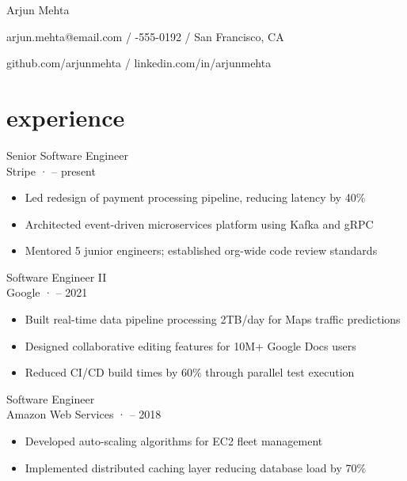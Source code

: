\documentclass[10pt,letterpaper]{article}
\begin{document}
\vspace*{-20pt}
{\huge{}\selectfont Arjun Mehta}

\vspace{8pt}
{\small\color{lightgray} arjun.mehta@email.com \enspace / -555-0192 \enspace / \enspace San Francisco, CA}

\vspace{4pt}
{\small\color{lightgray} github.com/arjunmehta \enspace / \enspace linkedin.com/in/arjunmehta}

\section{experience}

{\normalsize Senior Software Engineer} \\[1pt]
{\small\color{lightgray} Stripe \enspace ·  -- present}
\vspace{4pt}
\begin{itemize}[leftmargin=1em, label={\textcolor{lightgray}{--}}, topsep=0pt, itemsep=3pt, parsep=0pt]
  \item Led redesign of payment processing pipeline, reducing latency by 40\%
  \item Architected event-driven microservices platform using Kafka and gRPC
  \item Mentored 5 junior engineers; established org-wide code review standards
\end{itemize}

\vspace{10pt}
{\normalsize Software Engineer II} \\[1pt]
{\small\color{lightgray} Google \enspace ·  -- 2021}
\vspace{4pt}
\begin{itemize}[leftmargin=1em, label={\textcolor{lightgray}{--}}, topsep=0pt, itemsep=3pt, parsep=0pt]
  \item Built real-time data pipeline processing 2TB/day for Maps traffic predictions
  \item Designed collaborative editing features for 10M+ Google Docs users
  \item Reduced CI/CD build times by 60\% through parallel test execution
\end{itemize}

\vspace{10pt}
{\normalsize Software Engineer} \\[1pt]
{\small\color{lightgray} Amazon Web Services \enspace ·  -- 2018}
\vspace{4pt}
\begin{itemize}[leftmargin=1em, label={\textcolor{lightgray}{--}}, topsep=0pt, itemsep=3pt, parsep=0pt]
  \item Developed auto-scaling algorithms for EC2 fleet management
  \item Implemented distributed caching layer reducing database load by 70\%
\end{itemize}
\end{document}

